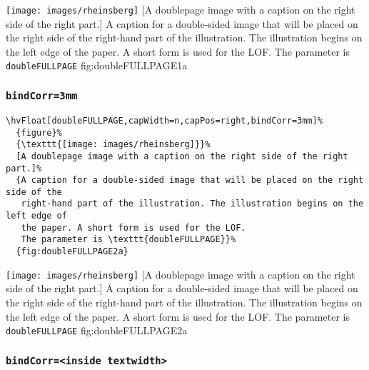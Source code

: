 \documentclass[twoside]{scrartcl}
\makeatletter
\let\hvBlindtext\Blindtext
\def\Blindtext{\par\color{black!40}\hvBlindtext\par\normalcolor}
\def\hvblindtext{\textcolor{black!40}{\blindtext@text}}
\makeatother
\begin{document}
%
  {\texttt{[image: images/rheinsberg]}}%
  [A doublepage image with a caption on the right side of the right part.]%
  {A caption for a double-sided image that will be placed on the right side of the
   right-hand part of the illustration. The illustration begins on the left edge of 
   the paper. A short form is used for the LOF. 
   The parameter is \texttt{doubleFULLPAGE}}%
  {fig:doubleFULLPAGE1a}

\hvblindtext

\Blindtext

\Blindtext

\subsubsection{\texttt{bindCorr=3mm}}
\begin{lstlisting}
\hvFloat[doubleFULLPAGE,capWidth=n,capPos=right,bindCorr=3mm]%
  {figure}%
  {\texttt{[image: images/rheinsberg]}}%
  [A doublepage image with a caption on the right side of the right part.]%
  {A caption for a double-sided image that will be placed on the right side of the
   right-hand part of the illustration. The illustration begins on the left edge of 
   the paper. A short form is used for the LOF. 
   The parameter is \texttt{doubleFULLPAGE}}%
  {fig:doubleFULLPAGE2a}
\end{lstlisting}

%
  {\texttt{[image: images/rheinsberg]}}%
  [A doublepage image with a caption on the right side of the right part.]%
  {A caption for a double-sided image that will be placed on the right side of the
   right-hand part of the illustration. The illustration begins on the left edge of 
   the paper. A short form is used for the LOF. 
   The parameter is \texttt{doubleFULLPAGE}}%
  {fig:doubleFULLPAGE2a}



\Blindtext

\Blindtext

\hvblindtext

\subsubsection{\texttt{bindCorr=<inside textwidth>}}
\end{document}

